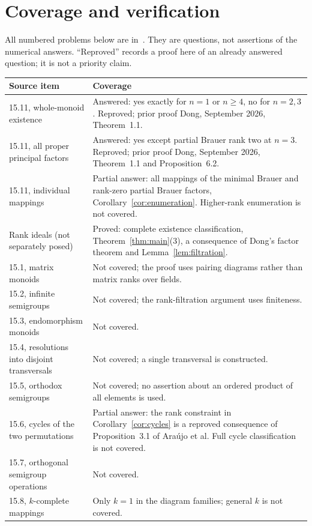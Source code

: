 \documentclass[11pt,a4paper]{article}
\begin{document}
\section{Coverage and verification}
All numbered problems below are in~\cite[Section~15, pp.~59--61]{ABCHK}. They are questions, not assertions of the numerical answers. ``Reproved'' records a proof here of an already answered question; it is not a priority claim.
\begingroup\small
\begin{longtable}{@{}p{}p{}@{}}
\toprule Source item & Coverage\\\midrule\endhead
15.11, whole-monoid existence & Answered: yes exactly for $n=1$ or $n\ge4$, no for $n=2,3$. Reproved; prior proof Dong, September 2026, Theorem~1.1.\\
15.11, all proper principal factors & Answered: yes except partial Brauer rank two at $n=3$. Reproved; prior proof Dong, September 2026, Theorem~1.1 and Proposition~6.2.\\
15.11, individual mappings & Partial answer: all mappings of the minimal Brauer and rank-zero partial Brauer factors, Corollary~\ref{cor:enumeration}. Higher-rank enumeration is not covered.\\
Rank ideals (not separately posed) & Proved: complete existence classification, Theorem~\ref{thm:main}(3), a consequence of Dong's factor theorem and Lemma~\ref{lem:filtration}.\\
15.1, matrix monoids & Not covered; the proof uses pairing diagrams rather than matrix ranks over fields.\\
15.2, infinite semigroups & Not covered; the rank-filtration argument uses finiteness.\\
15.3, endomorphism monoids & Not covered.\\
15.4, resolutions into disjoint transversals & Not covered; a single transversal is constructed.\\
15.5, orthodox semigroups & Not covered; no assertion about an ordered product of all elements is used.\\
15.6, cycles of the two permutations & Partial answer: the rank constraint in Corollary~\ref{cor:cycles} is a reproved consequence of Proposition~3.1 of Ara\'ujo et al. Full cycle classification is not covered.\\
15.7, orthogonal semigroup operations & Not covered.\\
15.8, $k$-complete mappings & Only $k=1$ in the diagram families; general $k$ is not covered.\\

\end{longtable}
\end{document}
